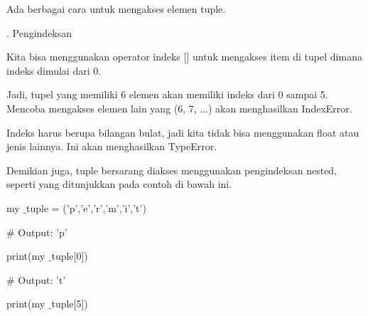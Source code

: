 \documentclass[a4paper,12pt]{report}
\begin{document}
\noindent 
\vspace{14pt}
\noindent 
{\fontsize{14pt}{14pt}\selectfont Ada berbagai cara untuk mengakses elemen tuple. \\} \par
\noindent 
{\fontsize{14pt}{14pt}. Pengindeksan \\} \par
\noindent 
\vspace{14pt}
\noindent 
{\fontsize{14pt}{14pt}\selectfont Kita bisa menggunakan operator indeks [] untuk mengakses item di tupel dimana indeks dimulai dari 0. \\} \par
\noindent 
\vspace{14pt}
\noindent 
{\fontsize{14pt}{14pt}\selectfont Jadi, tupel yang memiliki 6 elemen akan memiliki indeks dari 0 sampai 5. Mencoba mengakses elemen lain yang (6, 7, ...) akan menghasilkan IndexError. \\} \par
\noindent 
\vspace{14pt}
\noindent 
{\fontsize{14pt}{14pt}\selectfont Indeks harus berupa bilangan bulat, jadi kita tidak bisa menggunakan float atau jenis lainnya. Ini akan menghasilkan TypeError. \\} \par
\noindent 
\vspace{14pt}
\noindent 
{\fontsize{14pt}{14pt}\selectfont Demikian juga, tuple bersarang diakses menggunakan pengindeksan nested, seperti yang ditunjukkan pada contoh di bawah ini. \\} \par
\noindent 
{\fontsize{20pt}{20pt}\selectfont my $  \_  $tuple = ('p','e','r','m','i','t') \\} \par
\vspace{20pt}
\noindent 
{\fontsize{20pt}{20pt}\selectfont  $  \#  $ Output: 'p' \\} \par
\noindent 
{\fontsize{20pt}{20pt}\selectfont print(my $  \_  $tuple[0]) \\} \par
\vspace{20pt}
\noindent 
{\fontsize{20pt}{20pt}\selectfont  $  \#  $ Output: 't' \\} \par
\noindent 
{\fontsize{20pt}{20pt}\selectfont print(my $  \_  $tuple[5]) \\} \par
\end{document}
